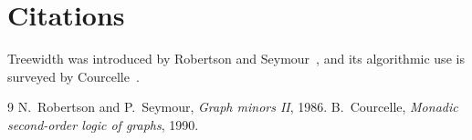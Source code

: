 \section{Citations}

Treewidth was introduced by Robertson and Seymour~\cite{rs86}, and its
algorithmic use is surveyed by Courcelle~\cite{courcelle90}.

\begin{thebibliography}{9}
 N.~Robertson and P.~Seymour, \emph{Graph minors II}, 1986.
 B.~Courcelle, \emph{Monadic second-order logic of
graphs}, 1990.
\end{thebibliography}
